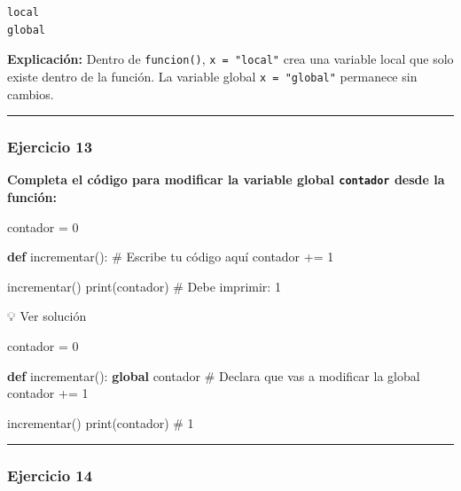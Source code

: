 \documentclass[
  doc,
  floatsintext,
  longtable,
  a4paper,
  nolmodern,
  notxfonts,
  notimes,
  12pt,
  colorlinks=true,linkcolor=blue,citecolor=blue,urlcolor=blue]{apa7}
\newenvironment{Shaded}{\begin{snugshade}}{\end{snugshade}}
\newcommand{\BuiltInTok}[1]{\textcolor[rgb]{0.00,0.23,0.31}{#1}}
\newcommand{\CommentTok}[1]{\textcolor[rgb]{0.37,0.37,0.37}{#1}}
\newcommand{\DecValTok}[1]{\textcolor[rgb]{0.68,0.00,0.00}{#1}}
\newcommand{\KeywordTok}[1]{\textcolor[rgb]{0.00,0.23,0.31}{\textbf{#1}}}
\newcommand{\NormalTok}[1]{\textcolor[rgb]{0.00,0.23,0.31}{#1}}
\newcommand{\OperatorTok}[1]{\textcolor[rgb]{0.37,0.37,0.37}{#1}}
\begin{document}
\begin{verbatim}
local
global
\end{verbatim}

\textbf{Explicación:} Dentro de \texttt{funcion()},
\texttt{x\ =\ "local"} crea una variable local que solo existe dentro de
la función. La variable global \texttt{x\ =\ "global"} permanece sin
cambios.

\begin{center}\rule{0.5\linewidth}{0.5pt}\end{center}

\subsubsection{Ejercicio 13}\label{ejercicio-13}

\textbf{Completa el código para modificar la variable global
\texttt{contador} desde la función:}

\begin{Shaded}
\begin{Highlighting}[]
\NormalTok{contador }\OperatorTok{=} \DecValTok{0}

\KeywordTok{def}\NormalTok{ incrementar():}
    \CommentTok{\# Escribe tu código aquí}
\NormalTok{    contador }\OperatorTok{+=} \DecValTok{1}

\NormalTok{incrementar()}
\BuiltInTok{print}\NormalTok{(contador)  }\CommentTok{\# Debe imprimir: 1}
\end{Highlighting}
\end{Shaded}

💡 Ver solución

\begin{Shaded}
\begin{Highlighting}[]
\NormalTok{contador }\OperatorTok{=} \DecValTok{0}

\KeywordTok{def}\NormalTok{ incrementar():}
    \KeywordTok{global}\NormalTok{ contador  }\CommentTok{\# Declara que vas a modificar la global}
\NormalTok{    contador }\OperatorTok{+=} \DecValTok{1}

\NormalTok{incrementar()}
\BuiltInTok{print}\NormalTok{(contador)  }\CommentTok{\# 1}
\end{Highlighting}
\end{Shaded}

\begin{center}\rule{0.5\linewidth}{0.5pt}\end{center}

\subsubsection{Ejercicio 14}\label{ejercicio-14}
\end{document}
